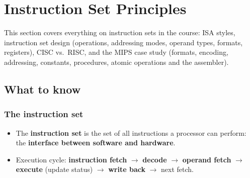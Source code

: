 \section{Instruction Set Principles}
\label{sec:isa}

This section covers everything on instruction sets in the course: ISA styles,
instruction set design (operations, addressing modes, operand types, formats,
registers), CISC vs.\ RISC, and the MIPS case study (formats, encoding,
addressing, constants, procedures, atomic operations and the assembler).

\subsection{What to know}

\subsubsection{The instruction set}
\begin{itemize}[leftmargin=*]
  \item The \textbf{instruction set} is the set of all instructions a
  processor can perform: the \textbf{interface between software and
  hardware}.
  \item Execution cycle: \textbf{instruction fetch} $\to$ \textbf{decode} $\to$
  \textbf{operand fetch} $\to$ \textbf{execute} (update status) $\to$
  \textbf{write back} $\to$ next fetch.
\end{itemize}

